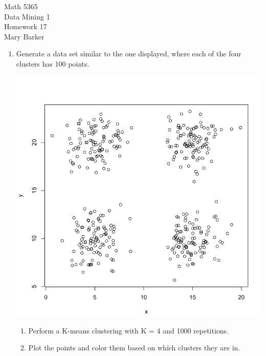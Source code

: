 \documentclass[11pt]{article}
\begin{document}
\noindent\large{Math 5365}\\
\large{Data Mining 1}\\
\large{Homework 17}\\
\large{Mary Barker}
\doublespace
\begin{enumerate}
\item 
 Generate a data set similar to the one displayed, where each of the 
 four clusters has 100 points.

\begin{center}
\includegraphics[scale=0.35]{pix/scatter_plot}
\end{center}

\begin{enumerate}
\item 
 Perform a K-means clustering with K = 4 and 1000 repetitions.

\item
 Plot the points and color them based on which clusters they are in.


\end{enumerate}
\end{enumerate}
\end{document}
